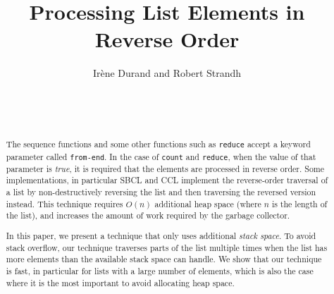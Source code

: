 \documentclass{acm_proc_article-sp}
\begin{document}
\title{Processing List Elements in Reverse Order}
\author{\alignauthor
Irène Durand and Robert Strandh\\
\\
\\
\\
}


\maketitle

\begin{abstract}
The \commonlisp{} sequence functions and some other functions such as
\texttt{reduce} accept a keyword parameter called \texttt{from-end}.
In the case of \texttt{count} and \texttt{reduce}, when the value of
that parameter is \emph{true}, it is required that the elements are
processed in reverse order.  Some implementations, in particular SBCL
and CCL implement the reverse-order traversal of a list by
non-destructively reversing the list and then traversing the reversed
version instead.  This technique requires $O(n)$ additional heap space 
(where $n$ is the length of the list),
and increases the amount of work required by the garbage collector.

In this paper, we present a technique that only uses additional
\emph{stack space}.  To avoid stack overflow, our technique traverses
parts of the list multiple times when the list has more elements than
the available stack space can handle.  We show that our technique is
fast, in particular for lists with a large number of elements, which
is also the case where it is the most important to avoid allocating
heap space.
\end{abstract}
\end{document}
